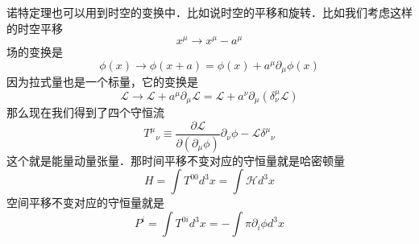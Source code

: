 诺特定理也可以用到时空的变换中．比如说时空的平移和旋转．比如我们考虑这样的时空平移
\begin{equation}
x^\mu \rightarrow x^\mu - a^\mu 
\end{equation}
场的变换是
\begin{equation}
\phi(x) \rightarrow \phi (x+a) = \phi (x) + a^\mu \partial_\mu \phi(x)
\end{equation}
因为拉式量也是一个标量，它的变换是
\begin{equation}
\mathcal L \rightarrow \mathcal L + a^\mu \partial_\mu \mathcal L  = \mathcal L + a^\nu \partial_\mu (\delta^\mu_\nu \mathcal L)
\end{equation}
那么现在我们得到了四个守恒流
\begin{equation}\label{classi_eq2}
T^\mu{}_\nu \equiv \frac{\partial \mathcal L}{\partial (\partial_\mu \phi)} \partial_\nu \phi - \mathcal L \delta^\mu{}_\nu
\end{equation}
这个就是能量动量张量．那时间平移不变对应的守恒量就是哈密顿量
\begin{equation}
H = \int T^{00} d^3 x = \int \mathcal H d^3 x
\end{equation}
空间平移不变对应的守恒量就是
\begin{equation}
P^i = \int T^{0i} d^3x = - \int \pi \partial_i \phi d^3 x 
\end{equation}
















